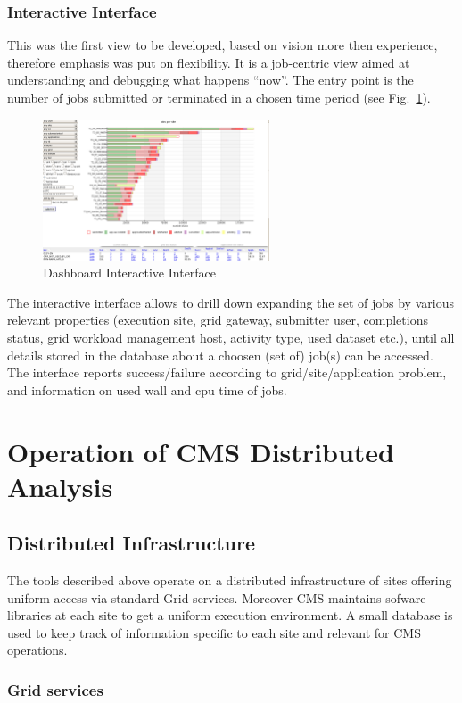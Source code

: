 \subsubsection{Interactive Interface}
This was the first view to be developed, based on
vision more then experience, therefore
emphasis was put on flexibility. It is a job-centric view
aimed at understanding and debugging what happens ``now''.
The entry point is the number of jobs submitted or
terminated in a chosen time period (see Fig.~\ref{fig:Dashboard}).
\begin{figure}
 \includegraphics[width=0.60\textwidth]{figures/DashboardInteractive.png}
\caption{Dashboard Interactive Interface}
\label{fig:Dashboard}
\end{figure}
The interactive interface allows to drill down expanding the set of jobs by
various relevant properties (execution site, grid gateway,
submitter user, completions status, grid workload management host,
activity type, used dataset etc.), until all details stored in the database
about a choosen (set of) job(s) can be accessed.
The interface reports success/failure
according to grid/site/application problem, and information
on used wall and cpu time of jobs.

\section{Operation of CMS Distributed Analysis}
\label{sec:4}
\subsection{Distributed Infrastructure}
\label{sec:4_1}
The tools described above operate on a distributed infrastructure
of sites offering uniform access via standard Grid services. Moreover CMS maintains sofware libraries at each site to get a uniform execution
environment. A small database is used to keep track of
information specific to each site and relevant for CMS operations.

\subsubsection{ Grid services }
\label{sec:4_1_1}

